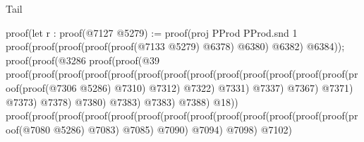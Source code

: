 \begin{lexlean}{Tail}
\begin{coremodule}
                                          proof(let r : proof(@7127
                                                @5279) := proof(proj PProd PProd.snd 1
                                              proof(proof(proof(proof(proof(@7133 @5279) @6378)
                                                      @6380)
                                                    @6382)
                                                  @6384));
                                            proof(proof(@3286
                                                  proof(proof(@39
                                                        proof(proof(proof(proof(proof(proof(proof(proof(proof(proof(proof(proof(proof(proof(proof(@7306
                                                                                        @5286)
                                                                                      @7310)
                                                                                    @7312)
                                                                                  @7322)
                                                                                @7331)
                                                                              @7337)
                                                                            @7367)
                                                                          @7371)
                                                                        @7373)
                                                                      @7378)
                                                                    @7380)
                                                                  @7383)
                                                                @7383)
                                                              @7388)
                                                            @18))
                                                      proof(proof(proof(proof(proof(proof(proof(proof(proof(proof(proof(proof(proof(proof(@7080
                                                                                    @5286)
                                                                                  @7083)
                                                                                @7085)
                                                                              @7090)
                                                                            @7094)
                                                                          @7098)
                                                                        @7102)

\end{coremodule}
\end{lexlean}
